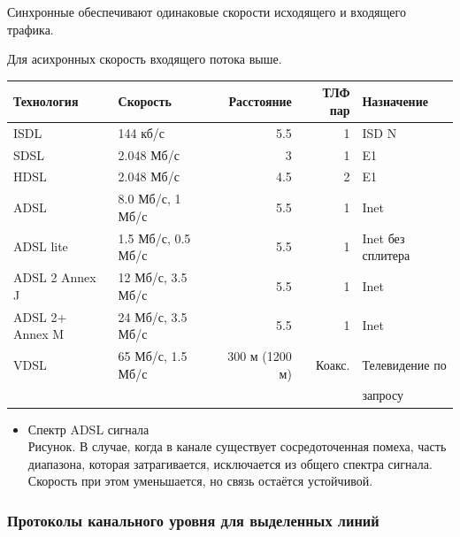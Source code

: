 \documentclass[12pt, russian, oneside, article]{ncc}
\begin{document}
Синхронные обеспечивают одинаковые скорости исходящего и входящего трафика.

Для асихронных скорость входящего потока выше.


\begin{center}
\begin{tabular}{llrrl}
 Технология       &  Скорость            &      Расстояние  &  ТЛФ пар  &  Назначение         \\
\hline
 ISDL             &  144 кб/с            &             5.5  &        1  &  ISD N              \\
 SDSL             &  2.048 Мб/с          &               3  &        1  &  E1                 \\
 HDSL             &  2.048 Мб/с          &             4.5  &        2  &  E1                 \\
\hline
 ADSL             &  8.0 Мб/с, 1 Мб/с    &             5.5  &        1  &  Inet               \\
 ADSL lite        &  1.5 Мб/с, 0.5 Мб/с  &             5.5  &        1  &  Inet без сплитера  \\
 ADSL 2 Annex J   &  12 Мб/с, 3.5 Мб/с   &             5.5  &        1  &  Inet               \\
 ADSL 2+ Annex M  &  24 Мб/с, 3.5 Мб/с   &             5.5  &        1  &  Inet               \\
\hline
 VDSL             &  65 Мб/с, 1.5 Мб/с   &  300 м (1200 м)  &   Коакс.  &  Телевидение по     \\
                  &                      &                  &           &  запросу            \\
\end{tabular}
\end{center}
\begin{itemize}

\item Спектр ADSL сигнала\\
\label{sec-5_2_10_1}%
Рисунок. В случае, когда в канале существует сосредоточенная помеха, часть диапазона, которая затрагивается, исключается из общего спектра сигнала. Скорость при этом уменьшается, но связь остаётся устойчивой.

\end{itemize} %
\subsubsection{Протоколы канального уровня для выделенных линий}
\label{sec-5_2_11}
\end{document}
